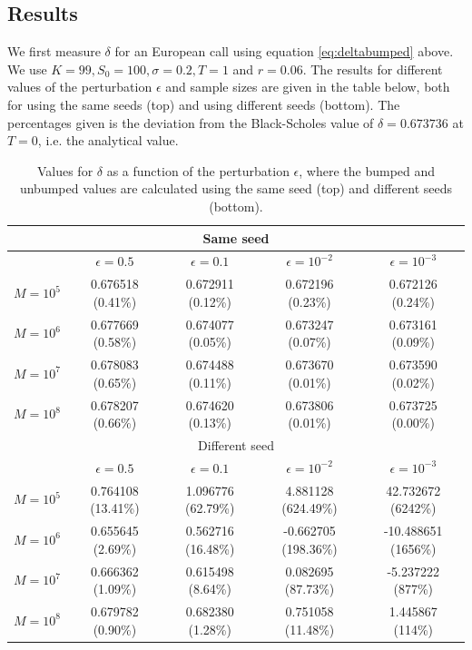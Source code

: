 \documentclass[11pt,a4paper]{article}
\begin{document}
\subsection{Results}
We first measure $\delta$ for an European call using equation \ref{eq:deltabumped} above. We use $K = 99, S_0 = 100, \sigma = 0.2, T = 1$ and $r = 0.06$. The results for different values of the perturbation $\epsilon$ and sample sizes are given in the table below, both for using the same seeds (top) and using different seeds (bottom). The percentages given is the deviation from the Black-Scholes value of $\delta = 0.673736$ at $T = 0$, i.e. the analytical value.

\begin{table}[H]
  \centering
  \begin{tabular}{l || c | c | c | c}
    \hline
    \multicolumn{5}{c}{Same seed} \\
    \hline
    & $\epsilon = 0.5$ & $\epsilon = 0.1$ & $\epsilon = 10^{-2}$ & $\epsilon = 10^{-3}$ \\
    \hline
    $M = 10^5$ & 0.676518 (0.41\%) & 0.672911 (0.12\%) & 0.672196 (0.23\%) & 0.672126 (0.24\%) \\
    $M = 10^6$ & 0.677669 (0.58\%) & 0.674077 (0.05\%) & 0.673247 (0.07\%) & 0.673161 (0.09\%) \\
    $M = 10^7$ & 0.678083 (0.65\%) & 0.674488 (0.11\%) & 0.673670 (0.01\%) & 0.673590 (0.02\%) \\
    $M = 10^8$ & 0.678207 (0.66\%) & 0.674620 (0.13\%) & 0.673806 (0.01\%) & 0.673725 (0.00\%)\\
    \hline
    \multicolumn{5}{c}{Different seed} \\
    \hline
    & $\epsilon = 0.5$ & $\epsilon = 0.1$ & $\epsilon = 10^{-2}$ & $\epsilon = 10^{-3}$ \\
    \hline
    $M = 10^5$ & 0.764108 (13.41\%) & 1.096776 (62.79\%) & 4.881128 (624.49\%) & 42.732672 (6242\%) \\
    $M = 10^6$ & 0.655645 (2.69\%) & 0.562716 (16.48\%) & -0.662705 (198.36\%) & -10.488651 (1656\%) \\
    $M = 10^7$ & 0.666362 (1.09\%) & 0.615498 (8.64\%) & 0.082695 (87.73\%) & -5.237222 (877\%) \\
    $M = 10^8$ & 0.679782 (0.90\%) & 0.682380 (1.28\%) & 0.751058 (11.48\%) & 1.445867 (114\%)\\
  \end{tabular}
  \caption{Values for $\delta$ as a function of the perturbation $\epsilon$, where the bumped and unbumped values are calculated using the same seed (top) and different seeds (bottom).}
  \label{tab:delta}
\end{table}
\end{document}
